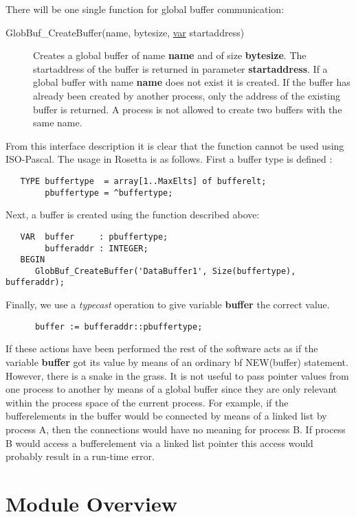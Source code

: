 There will be one single function for global buffer communication:
\begin{description}
   \item[GlobBuf\_CreateBuffer(name, bytesize, \underline{var} startaddress)] Creates
       a global buffer of name {\bf name} and of size {\bf bytesize}. The 
       startaddress of the buffer is returned in parameter {\bf startaddress}.
       If a global buffer with name {\bf name} does not exist it is created. If
       the buffer has already been created by another process, only the address
       of the existing buffer is returned. A process is not allowed to create 
       two buffers with the same name.
\end{description}

From this interface description it is clear that the function cannot be used 
using ISO-Pascal. The usage in Rosetta is as follows. First a buffer type is 
defined :
\begin{verbatim}
   TYPE buffertype  = array[1..MaxElts] of bufferelt;
        pbuffertype = ^buffertype;
\end{verbatim}
Next, a buffer is created using the function described above:
\begin{verbatim}
   VAR  buffer     : pbuffertype;
        bufferaddr : INTEGER;
   BEGIN
      GlobBuf_CreateBuffer('DataBuffer1', Size(buffertype), bufferaddr);
\end{verbatim}
Finally, we use a {\em typecast} operation to give variable {\bf buffer} the
correct value.
\begin{verbatim}
      buffer := bufferaddr::pbuffertype;
\end{verbatim}
If these actions have been performed the rest of the software acts as if the 
variable {\bf buffer} got its value by means of an ordinary {bf NEW(buffer)} 
statement. However, there is a snake in the grass. It is not useful to pass
pointer values from one process to another by means of a global buffer since 
they are only relevant 
within the process space of the current process. For example, if the 
bufferelements in the buffer would be connected by means of a linked list by 
process A, then the connections would have no meaning for process B. If
process B would access a bufferelement via a linked list pointer this 
access would probably result in a run-time error.
\section{Module Overview}

